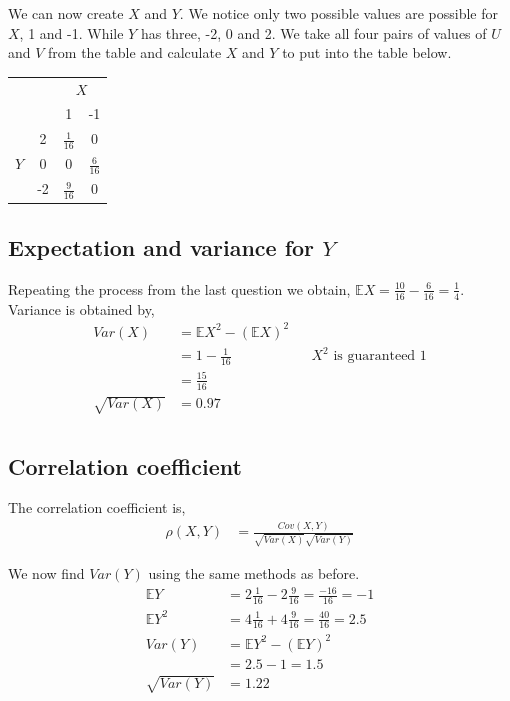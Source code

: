 \documentclass{article}
\newcommand{\expect}{\mathbb{E}}
\begin{document}
We can now create $X$ and $Y$.
We notice only two possible values are possible for $X$, 1 and -1. While
$Y$ has three, -2, 0 and 2. We take all four pairs of values of $U$ and $V$
from the table and calculate $X$ and $Y$ to put into the table below.
\begin{center}
\begin{tabular}{ c c|c c  }
    & & \multicolumn{2}{c}{$X$} \\
    & & 1 & -1\\
    \hline
    \multirow{3}{*}{$Y$} & 2 & $\frac{1}{16}$ & 0 \\
    & 0 & 0 & $\frac{6}{16}$ \\
    & -2 & $\frac{9}{16}$ & 0 \\
\end{tabular}
\end{center}

\subsection{Expectation and variance for $Y$}
Repeating the process from the last question we obtain,
$\expect X = \frac{10}{16} - \frac{6}{16} = \frac{1}{4}$.
Variance is obtained by,
\begin{align*}
    Var(X) &= \expect X^2 - (\expect X)^2 \\
    &= 1 - \frac{1}{16} && \text{$X^2$ is guaranteed 1} \\
    &= \frac{15}{16} \\
    \sqrt{Var(X)} &= 0.97 \\
\end{align*}

\subsection{Correlation coefficient}
The correlation coefficient is,
\begin{align*}
    \rho(X,Y) &= \frac{Cov(X,Y)}{\sqrt{Var(X)}\sqrt{Var(Y)}}
\end{align*}

We now find $Var(Y)$ using the same methods as before.
\begin{align*}
    \expect Y &= 2\frac{1}{16} - 2\frac{9}{16} = \frac{-16}{16} = -1 \\
    \expect Y^2 &= 4\frac{1}{16} + 4\frac{9}{16} = \frac{40}{16} = 2.5 \\
    Var(Y) &= \expect Y^2 - (\expect Y)^2 \\
    &= 2.5 - 1 = 1.5 \\
    \sqrt{Var(Y)} &= 1.22 \\
\end{align*}
 
\end{document}
